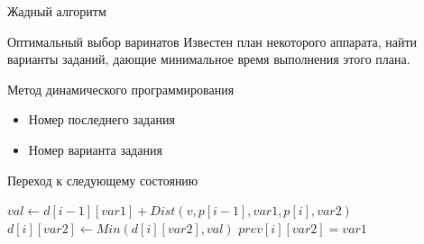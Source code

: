 \documentclass{beamer}
\begin{document}
\begin{frame}{Жадный алгоритм}

\end{frame}

\begin{frame}{Оптимальный выбор варинатов}
Известен план некоторого аппарата, найти варианты заданий, дающие минимальное время выполнения этого плана.

Метод динамического программирования
\begin{itemize}
\item Номер последнего задания
\item Номер варианта задания
\end{itemize}

\begin{exampleblock}{Переход к следующему состоянию}

\begin{algorithmic}
\State $val \gets d[i - 1][var1] + Dist(v, p[i - 1], var1, p[i], var2)$
    \State $d[i][var2] \gets Min(d[i][var2], val)$
    \State $prev[i][var2] = var1$
\EndIf
\end{algorithmic}

\end{exampleblock}

\end{frame}
\end{document}
